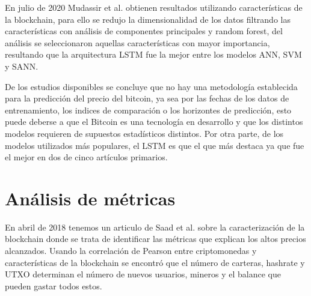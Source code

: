 En julio de 2020 Mudassir et al. \cite{mudassirTimeseriesForecastingBitcoin2020} obtienen resultados utilizando características de la blockchain, para ello se redujo la dimensionalidad de los datos filtrando las características con análisis de componentes principales y random forest, del análisis se seleccionaron aquellas características con mayor importancia, resultando que la arquitectura LSTM fue la mejor entre los modelos ANN, SVM y SANN.


De los estudios disponibles se concluye que no hay una metodología establecida para la predicción del precio del bitcoin, ya sea por las fechas de los datos de entrenamiento, los indices de comparación o los horizontes de predicción, esto puede deberse a que el Bitcoin es una tecnología en desarrollo y que los distintos modelos requieren de supuestos estadísticos distintos. 
Por otra parte, de los modelos utilizados más populares, el LSTM es que el que más destaca ya que fue el mejor en dos de cinco artículos primarios.



\section{Análisis de métricas} 

En abril de 2018 tenemos un articulo de Saad et al. \cite{saadCharacterizingBlockchainbasedCryptocurrencies2018} sobre la caracterización de la blockchain donde se trata de identificar las métricas que explican los altos precios alcanzados. Usando la correlación de Pearson entre criptomonedas y características de la blockchain se encontró que el número de carteras, hashrate y UTXO determinan el número de nuevos usuarios, mineros y el balance que pueden gastar todos estos. 


